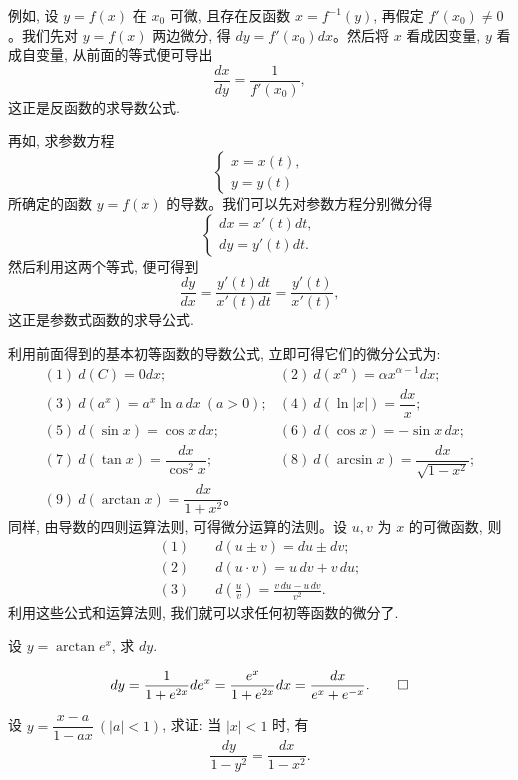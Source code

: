例如, 设 $y=f(x)$ 在 $x_0$ 可微, 且存在反函数 $x=f^{-1}(y)$, 再假定 $f'(x_0)\ne0$。我们先对 $y=f(x)$ 两边微分, 得 $dy=f'(x_0)dx$。然后将 $x$ 看成因变量, $y$ 看成自变量, 从前面的等式便可导出
\[
  \frac{dx}{dy}=\frac{1}{f'(x_0)},
\]
这正是反函数的求导数公式.

再如, 求参数方程
\[
  \begin{cases}
    x=x(t),\\
    y=y(t)
  \end{cases}
\]
所确定的函数 $y=f(x)$ 的导数。我们可以先对参数方程分别微分得
\[
  \begin{cases}
    dx=x'(t)dt,\\
    dy=y'(t)dt.
  \end{cases}
\]
然后利用这两个等式, 便可得到
\[
  \frac{dy}{dx}
  =
  \frac{y'(t)dt}{x'(t)dt}
  =
  \frac{y'(t)}{x'(t)},
\]
这正是参数式函数的求导公式.

利用前面得到的基本初等函数的导数公式, 立即可得它们的微分公式为:
\[
\begin{array}{ll}
  (1)\ d(C)=0dx; & (2)\ d(x^\alpha)=\alpha x^{\alpha-1}dx;\\[4pt]
  (3)\ d(a^x)=a^x\ln a\,dx\ (a>0); &
  (4)\ d(\ln|x|)=\dfrac{dx}{x};\\[8pt]
  (5)\ d(\sin x)=\cos x\,dx; &
  (6)\ d(\cos x)=-\sin x\,dx;\\[4pt]
  (7)\ d(\tan x)=\dfrac{dx}{\cos^2 x}; &
  (8)\ d(\arcsin x)=\dfrac{dx}{\sqrt{1-x^2}};\\[8pt]
  (9)\ d(\arctan x)=\dfrac{dx}{1+x^2}。&
\end{array}
\]
同样, 由导数的四则运算法则, 可得微分运算的法则。设 $u,v$ 为 $x$ 的可微函数, 则
\[
\begin{aligned}
  (1)\quad &d(u\pm v)=du\pm dv;\\
  (2)\quad &d(u\cdot v)=u\,dv+v\,du;\\
  (3)\quad &d\left(\frac{u}{v}\right)=\frac{v\,du-u\,dv}{v^2}.
\end{aligned}
\]
利用这些公式和运算法则, 我们就可以求任何初等函数的微分了.

\begin{example}\label{example:ma-4-3-3}
设 $y=\arctan e^x$, 求 $dy$.
\end{example}


\begin{solve}
\[
  dy
  =
  \frac{1}{1+e^{2x}}de^x
  =
  \frac{e^x}{1+e^{2x}}dx
  =
  \frac{dx}{e^x+e^{-x}}.
\qedhere
\]
\end{solve}


\begin{example}\label{example:ma-4-3-4}
设 $y=\dfrac{x-a}{1-ax}\ (|a|<1)$, 求证: 当 $|x|<1$ 时, 有
\[
  \frac{dy}{1-y^2}=\frac{dx}{1-x^2}.
\]
\end{example}


